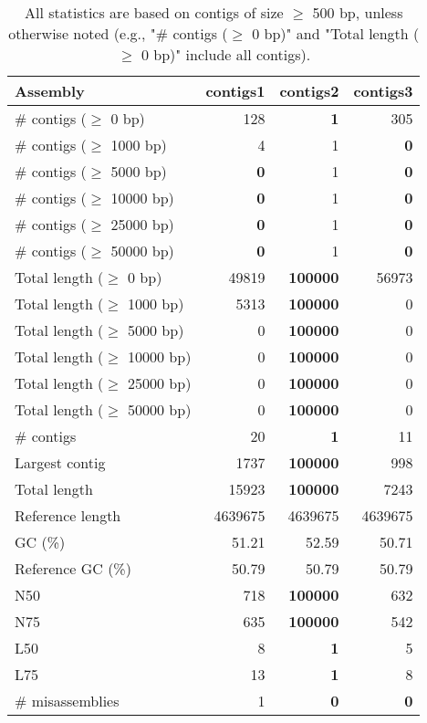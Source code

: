 \documentclass[12pt,a4paper]{article}
\begin{document}
\begin{table}[ht]
\begin{center}
\caption{All statistics are based on contigs of size $\geq$ 500 bp, unless otherwise noted (e.g., "\# contigs ($\geq$ 0 bp)" and "Total length ($\geq$ 0 bp)" include all contigs).}
\begin{tabular}{|l*{3}{|r}|}
\hline
Assembly & contigs1 & contigs2 & contigs3 \\ \hline
\# contigs ($\geq$ 0 bp) & 128 & {\bf 1} & 305 \\ \hline
\# contigs ($\geq$ 1000 bp) & 4 & 1 & {\bf 0} \\ \hline
\# contigs ($\geq$ 5000 bp) & {\bf 0} & 1 & {\bf 0} \\ \hline
\# contigs ($\geq$ 10000 bp) & {\bf 0} & 1 & {\bf 0} \\ \hline
\# contigs ($\geq$ 25000 bp) & {\bf 0} & 1 & {\bf 0} \\ \hline
\# contigs ($\geq$ 50000 bp) & {\bf 0} & 1 & {\bf 0} \\ \hline
Total length ($\geq$ 0 bp) & 49819 & {\bf 100000} & 56973 \\ \hline
Total length ($\geq$ 1000 bp) & 5313 & {\bf 100000} & 0 \\ \hline
Total length ($\geq$ 5000 bp) & 0 & {\bf 100000} & 0 \\ \hline
Total length ($\geq$ 10000 bp) & 0 & {\bf 100000} & 0 \\ \hline
Total length ($\geq$ 25000 bp) & 0 & {\bf 100000} & 0 \\ \hline
Total length ($\geq$ 50000 bp) & 0 & {\bf 100000} & 0 \\ \hline
\# contigs & 20 & {\bf 1} & 11 \\ \hline
Largest contig & 1737 & {\bf 100000} & 998 \\ \hline
Total length & 15923 & {\bf 100000} & 7243 \\ \hline
Reference length & 4639675 & 4639675 & 4639675 \\ \hline
GC (\%) & 51.21 & 52.59 & 50.71 \\ \hline
Reference GC (\%) & 50.79 & 50.79 & 50.79 \\ \hline
N50 & 718 & {\bf 100000} & 632 \\ \hline
N75 & 635 & {\bf 100000} & 542 \\ \hline
L50 & 8 & {\bf 1} & 5 \\ \hline
L75 & 13 & {\bf 1} & 8 \\ \hline
\# misassemblies & 1 & {\bf 0} & {\bf 0} \\ \hline

\end{tabular}
\end{center}
\end{table}
\end{document}
